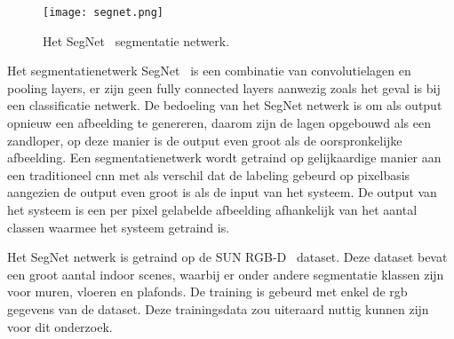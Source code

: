         \begin{figure}[!hb]
            \centering
            \texttt{[image: segnet.png]}
            \caption{Het SegNet~\cite{Badrinarayanan} segmentatie netwerk.}
            \label{fig:segnet_cnn}
        \end{figure}

        Het segmentatienetwerk SegNet~\cite{Badrinarayanan} is een combinatie van convolutielagen en pooling layers, er zijn geen fully connected layers aanwezig zoals het geval is bij een classificatie netwerk.
        De bedoeling van het SegNet netwerk is om als output opnieuw een afbeelding te genereren, daarom zijn de lagen opgebouwd als een zandloper, op deze manier is de output even groot als de oorspronkelijke afbeelding.
        Een segmentatienetwerk wordt getraind op gelijkaardige manier aan een traditioneel \gls{cnn} met als verschil dat de labeling gebeurd op pixelbasis aangezien de output even groot is als de input van het systeem.
        De output van het systeem is een per pixel gelabelde afbeelding afhankelijk van het aantal classen waarmee het systeem getraind is.

        Het SegNet netwerk is getraind op de SUN RGB-D~\cite{Song_2015_CVPR} dataset. Deze dataset bevat een groot aantal indoor scenes, waarbij er onder andere segmentatie klassen zijn voor muren, vloeren en plafonds.
        De training is gebeurd met enkel de \gls{rgb} gegevens van de dataset. Deze trainingsdata zou uiteraard nuttig kunnen zijn voor dit onderzoek.
